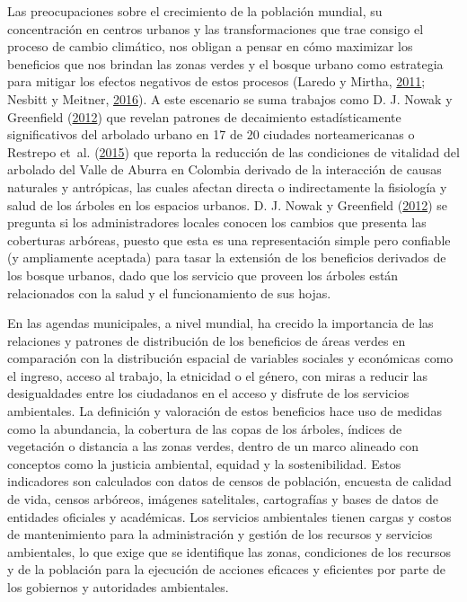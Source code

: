 \documentclass[12pt,a4paper,openany]{book}
\theoremstyle{definition}
\theoremstyle{definition}
\theoremstyle{definition}
\theoremstyle{remark}
\begin{document}
Las preocupaciones sobre el crecimiento de la población mundial, su
concentración en centros urbanos y las transformaciones que trae consigo
el proceso de cambio climático, nos obligan a pensar en cómo maximizar
los beneficios que nos brindan las zonas verdes y el bosque urbano como
estrategia para mitigar los efectos negativos de estos procesos (Laredo
y Mirtha, \protect\hyperlink{ref-laredo_gestion_2011}{2011}; Nesbitt y
Meitner, \protect\hyperlink{ref-nesbitt_exploring_2016}{2016}). A este
escenario se suma trabajos como D. J. Nowak y Greenfield
(\protect\hyperlink{ref-nowak_tree_2012}{2012}) que revelan patrones de
decaimiento estadísticamente significativos del arbolado urbano en 17 de
20 ciudades norteamericanas o Restrepo et~al.
(\protect\hyperlink{ref-restrepo_incidence_2015}{2015}) que reporta la
reducción de las condiciones de vitalidad del arbolado del Valle de
Aburra en Colombia derivado de la interacción de causas naturales y
antrópicas, las cuales afectan directa o indirectamente la fisiología y
salud de los árboles en los espacios urbanos. D. J. Nowak y Greenfield
(\protect\hyperlink{ref-nowak_tree_2012}{2012}) se pregunta si los
administradores locales conocen los cambios que presenta las coberturas
arbóreas, puesto que esta es una representación simple pero confiable (y
ampliamente aceptada) para tasar la extensión de los beneficios
derivados de los bosque urbanos, dado que los servicio que proveen los
árboles están relacionados con la salud y el funcionamiento de sus
hojas.

En las agendas municipales, a nivel mundial, ha crecido la importancia
de las relaciones y patrones de distribución de los beneficios de áreas
verdes en comparación con la distribución espacial de variables sociales
y económicas como el ingreso, acceso al trabajo, la etnicidad o el
género, con miras a reducir las desigualdades entre los ciudadanos en el
acceso y disfrute de los servicios ambientales. La definición y
valoración de estos beneficios hace uso de medidas como la abundancia,
la cobertura de las copas de los árboles, índices de vegetación o
distancia a las zonas verdes, dentro de un marco alineado con conceptos
como la justicia ambiental, equidad y la sostenibilidad. Estos
indicadores son calculados con datos de censos de población, encuesta de
calidad de vida, censos arbóreos, imágenes satelitales, cartografías y
bases de datos de entidades oficiales y académicas. Los servicios
ambientales tienen cargas y costos de mantenimiento para la
administración y gestión de los recursos y servicios ambientales, lo que
exige que se identifique las zonas, condiciones de los recursos y de la
población para la ejecución de acciones eficaces y eficientes por parte
de los gobiernos y autoridades ambientales.
\end{document}
